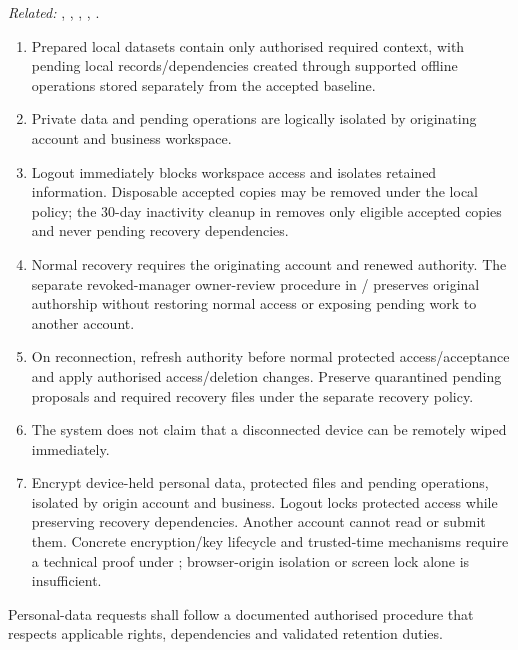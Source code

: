 \textit{Related:} \hyperref[fr:003]{}, \hyperref[fr:004]{}, \hyperref[fr:008]{}, \hyperref[fr:039]{}, \hyperref[fr:045]{}.
\begin{enumerate}[label=(\alph*),leftmargin=*,itemsep=1pt,topsep=3pt]
\item Prepared local datasets contain only authorised required context, with pending local records/dependencies created through supported offline operations stored separately from the accepted baseline.
\item Private data and pending operations are logically isolated by originating account and business workspace.
\item Logout immediately blocks workspace access and isolates retained information. Disposable accepted copies may be removed under the local policy; the 30-day inactivity cleanup in \hyperref[fr:003]{} removes only eligible accepted copies and never pending recovery dependencies.
\item Normal recovery requires the originating account and renewed authority. The separate revoked-manager owner-review procedure in \hyperref[fr:008]{}/\hyperref[nfr:REL-08]{} preserves original authorship without restoring normal access or exposing pending work to another account.
\item On reconnection, refresh authority before normal protected access/acceptance and apply authorised access/deletion changes. Preserve quarantined pending proposals and required recovery files under the separate recovery policy.
\item The system does not claim that a disconnected device can be remotely wiped immediately.
\item Encrypt device-held personal data, protected files and pending operations, isolated by origin account and business. Logout locks protected access while preserving recovery dependencies. Another account cannot read or submit them. Concrete encryption/key lifecycle and trusted-time mechanisms require a technical proof under ; browser-origin isolation or screen lock alone is insufficient.
\end{enumerate}

\label{nfr:PRV-04}
Personal-data requests shall follow a documented authorised procedure that respects applicable rights, dependencies and validated retention duties.

